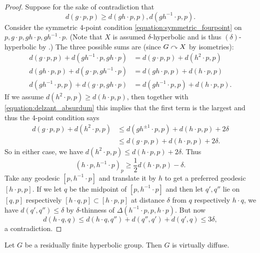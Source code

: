 \begin{proof}
    Suppose for the sake of contradiction that
    \begin{equation}
        \label{equation:delzant_absurdum}
        d(g \cdot p, p) \geq d(gh \cdot p, p), d(gh^{-1} \cdot p, p).
    \end{equation}
    Consider the symmetric 4-point condition \eqref{equation:symmetric_fourpoint} on $p, g \cdot p, gh \cdot p, gh^{-1} \cdot p$.
    (Note that $X$ is assumed $\delta$-hyperbolic and is thus $(\delta)$-hyperbolic by .)
    The three possible sums are (since $G \curvearrowright X$ by isometries):
    \begin{align*}
        d(g \cdot p, p) + d(gh^{-1} \cdot p, gh \cdot p)
        &= d(g \cdot p, p) + d(h^2 \cdot p, p) \\
        d(gh \cdot p, p) + d(g \cdot p, gh^{-1} \cdot p)
        &= d(gh \cdot p, p) + d(h \cdot p, p) \\
        d(gh^{-1} \cdot p, p) + d(g \cdot p, gh \cdot p)
        &= d(gh^{-1} \cdot p, p) + d(h \cdot p, p).
    \end{align*}
    If we assume $d(h^2 \cdot p, p) \geq d(h \cdot p, p)$, then together with \eqref{equation:delzant_absurdum} this implies that the first term is the largest and thus the 4-point condition says
    \begin{align*}
        d(g \cdot p, p) + d(h^2 \cdot p, p)
        & \leq d(g h^{\pm 1} \cdot p, p) + d(h \cdot p, p) + 2\delta \\
        & \leq d(g \cdot p, p) + d(h \cdot p, p) + 2\delta.
    \end{align*}
    So in either case, we have $d(h^2 \cdot p, p) \leq d(h \cdot p, p) + 2\delta$.
    Thus \[
        (h \cdot p, h^{-1} \cdot p)_p \geq \frac{1}{2} d(h \cdot p, p) - \delta.
    \]
    Take any geodesic $[p, h^{-1} \cdot p]$ and translate it by $h$ to get a preferred geodesic $[h \cdot p, p]$.
    If we let $q$ be the midpoint of $[p, h^{-1} \cdot p]$ and then let $q', q''$ lie on $[q, p]$ respectively $[h \cdot q, p] \subset [h \cdot p, p]$ at distance $\delta$ from $q$ respectively $h \cdot q$, we have $d(q', q'') \leq \delta$ by $\delta$-thinness of $\Delta(h^{-1} \cdot p, p, h \cdot p)$.
    But now \[
        d(h \cdot q, q) \leq d(h \cdot q, q'') + d(q'', q') + d(q', q) \leq 3\delta,
    \] a contradiction.

\end{proof}

\begin{corollary}
    Let $G$ be a residually finite hyperbolic group.
    Then $G$ is virtually diffuse.
\end{corollary}

